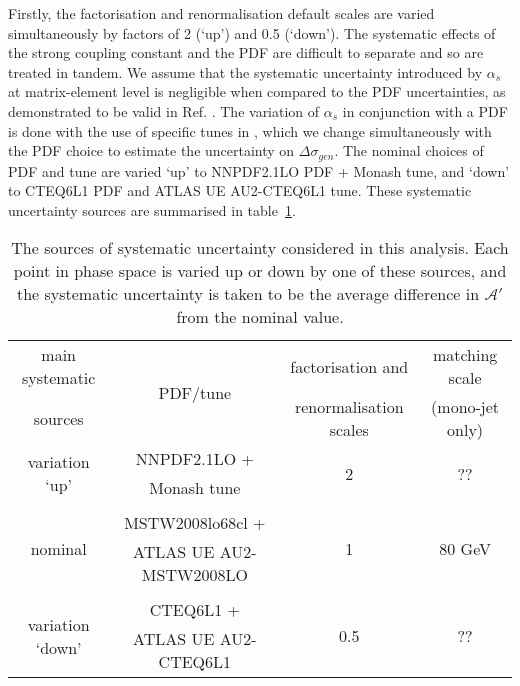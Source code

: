 %
%
Firstly, the factorisation and renormalisation default scales are varied simultaneously by factors of 2 (`up') and 0.5 (`down'). The systematic effects of the strong coupling constant and the PDF are difficult to separate and so are treated in tandem. We assume that the systematic uncertainty introduced by $\alpha_{s}$ at matrix-element level is negligible when compared to the PDF uncertainties, as demonstrated to be valid in Ref. \cite{CERN-THESIS-2015-038}. The variation of $\alpha_{s}$ in conjunction with a PDF is done with the use of specific tunes in \PYTHIA, which we change simultaneously with the PDF choice to estimate the uncertainty on $\Delta \sigma_{gen}$. The nominal choices of PDF and tune are varied `up' to NNPDF2.1LO PDF + Monash tune, and `down' to CTEQ6L1 PDF and ATLAS UE AU2-CTEQ6L1 tune.  These systematic uncertainty sources are summarised in table~\ref{tab:syst_unc}.

\begin{table}
\centering
\begin{tabular}{c|c|c|c}
\hline
\hline
main systematic & \multirow{2}{*}{PDF/tune} & factorisation and & matching scale \T \\
sources & & renormalisation scales & (mono-jet only) \B \\
\hline
\multirow{2}{*}{variation `up'} & NNPDF2.1LO + & \multirow{2}{*}{2} & \multirow{2}{*}{??} \T \\
& Monash tune & & \B \\
& & & \\
\multirow{2}{*}{nominal} & MSTW2008lo68cl + & \multirow{2}{*}{1} & \multirow{2}{*}{80 GeV} \T \\
& ATLAS UE AU2-MSTW2008LO & & \B \\
& & & \\
\multirow{2}{*}{variation `down'} & CTEQ6L1 + & \multirow{2}{*}{0.5} & \multirow{2}{*}{??} \T \\
& ATLAS UE AU2-CTEQ6L1 & & \B \\
\hline
\hline
\end{tabular}
\caption{The sources of systematic uncertainty considered in this analysis. Each point in phase space is varied up or down by one of these sources, and the systematic uncertainty is taken to be the average difference in $\mathcal{A}'$ from the nominal value. }
\label{tab:syst_unc}
\end{table}

